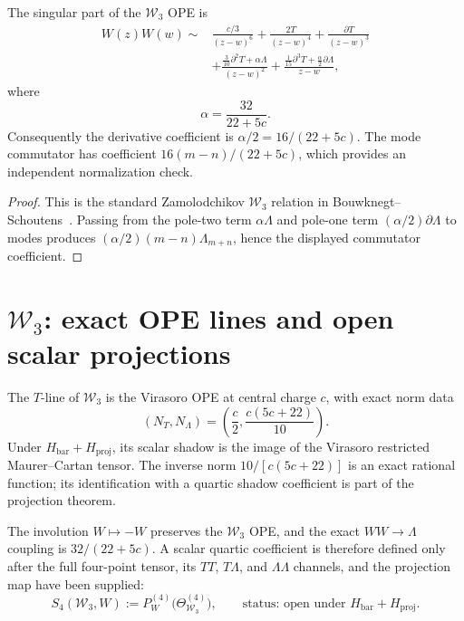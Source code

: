 \begin{proposition}
\label{prop:fateev-lukyanov-alpha}
The singular part of the $\mathcal W_3$ OPE is
\[
\begin{aligned}
W(z)W(w)\sim{}&\frac{c/3}{(z-w)^6}
 +\frac{2T}{(z-w)^4}+\frac{\partial T}{(z-w)^3}\\
&+\frac{\frac{3}{10}\partial^2T+\alpha\Lambda}{(z-w)^2}
 +\frac{\frac{1}{15}\partial^3T+\frac{\alpha}{2}\partial\Lambda}{z-w},
\end{aligned}
\]
where
\begin{equation}\label{eq:alpha-coefficient}
 \alpha=\frac{32}{22+5c}.
\end{equation}
Consequently the derivative coefficient is
$\alpha/2=16/(22+5c)$.  The mode commutator has coefficient
$16(m-n)/(22+5c)$, which provides an independent normalization check.
\end{proposition}

\begin{proof}
This is the standard Zamolodchikov $\mathcal W_3$ relation in
Bouwknegt--Schoutens~\cite{BowSch93}.  Passing from the pole-two term
$\alpha\Lambda$ and pole-one term $(\alpha/2)\partial\Lambda$ to modes
produces $(\alpha/2)(m-n)\Lambda_{m+n}$, hence the displayed
commutator coefficient.
\end{proof}

\section{$\mathcal W_3$: exact OPE lines and open scalar projections}
\label{sec:w3-s3-s4-closed-forms}

\begin{theorem}
\label{thm:w3-s3-s4-tline}
The $T$-line of $\mathcal W_3$ is the Virasoro OPE at central charge
$c$, with exact norm data
\begin{equation}\label{eq:w3-tline}
 (N_T,N_\Lambda)=\left(\frac c2,\frac{c(5c+22)}{10}\right).
\end{equation}
Under $H_{\mathrm{bar}}+H_{\mathrm{proj}}$, its scalar shadow is the
image of the Virasoro restricted Maurer--Cartan tensor.  The inverse
norm $10/[c(5c+22)]$ is an exact rational function; its identification
with a quartic shadow coefficient is part of the projection theorem.
\end{theorem}

\begin{theorem}
\label{thm:w3-w-line-s4-zamolodchikov}
The involution $W\mapsto-W$ preserves the $\mathcal W_3$ OPE, and the
exact $WW\to\Lambda$ coupling is $32/(22+5c)$.  A scalar quartic
coefficient is therefore defined only after the full four-point tensor,
its $TT$, $T\Lambda$, and $\Lambda\Lambda$ channels, and the projection
map have been supplied:
\begin{equation}\label{eq:w3-wline}
 S_4(\mathcal W_3,W)
 :=P_W^{(4)}\bigl(\Theta_{\mathcal W_3}^{(4)}\bigr),
 \qquad
 \text{status: open under }H_{\mathrm{bar}}+H_{\mathrm{proj}}.
\end{equation}
\end{theorem}

